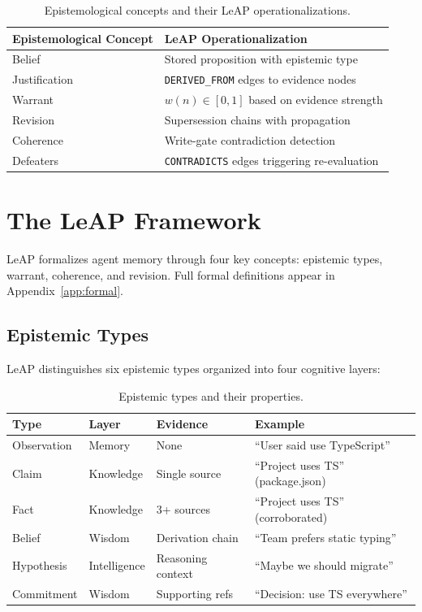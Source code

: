 \documentclass[11pt,letterpaper]{article}
\begin{document}
\begin{table}[H]
\centering
\caption{Epistemological concepts and their LeAP operationalizations.}
\label{tab:concepts}
\begin{tabular}{@{}ll@{}}
\toprule
\textbf{Epistemological Concept} & \textbf{LeAP Operationalization} \\
\midrule
Belief & Stored proposition with epistemic type \\
Justification & \texttt{DERIVED\_FROM} edges to evidence nodes \\
Warrant & $w(n) \in [0,1]$ based on evidence strength \\
Revision & Supersession chains with propagation \\
Coherence & Write-gate contradiction detection \\
Defeaters & \texttt{CONTRADICTS} edges triggering re-evaluation \\
\bottomrule
\end{tabular}
\end{table}

\clearpage

\section{The LeAP Framework}
\label{sec:leap}

LeAP formalizes agent memory through four key concepts: epistemic types, warrant, coherence, and revision. Full formal definitions appear in Appendix~\ref{app:formal}.

\subsection{Epistemic Types}

LeAP distinguishes six epistemic types organized into four cognitive layers:

\begin{table}[H]
\centering
\caption{Epistemic types and their properties.}
\label{tab:types}
\begin{tabular}{@{}lllp{4cm}@{}}
\toprule
\textbf{Type} & \textbf{Layer} & \textbf{Evidence} & \textbf{Example} \\
\midrule
Observation & Memory & None & ``User said use TypeScript'' \\
Claim & Knowledge & Single source & ``Project uses TS'' (package.json) \\
Fact & Knowledge & 3+ sources & ``Project uses TS'' (corroborated) \\
Belief & Wisdom & Derivation chain & ``Team prefers static typing'' \\
Hypothesis & Intelligence & Reasoning context & ``Maybe we should migrate'' \\
Commitment & Wisdom & Supporting refs & ``Decision: use TS everywhere'' \\
\bottomrule
\end{tabular}
\end{table}
\end{document}

